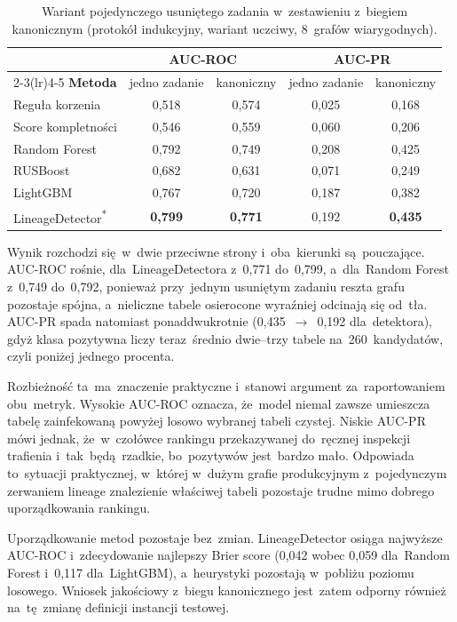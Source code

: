 \documentclass[polish,master,a4paper,oneside]{ppfcmthesis}
\renewcommand{\_}{\origtextunderscore\ifmmode\else\allowbreak\fi}
\begin{document}
\begin{table}[ht]
\centering
\caption[Wariant pojedynczego usuniętego zadania]{Wariant pojedynczego usuniętego zadania w~zestawieniu z~biegiem
kanonicznym (protokół indukcyjny, wariant uczciwy, 8~grafów wiarygodnych).}
\label{tab:jednojob}
\small
\begin{tabular}{lcccc}
\toprule
& \multicolumn{2}{c}{\textbf{AUC-ROC}} & \multicolumn{2}{c}{\textbf{AUC-PR}} \\
\cmidrule(lr){2-3}\cmidrule(lr){4-5}
\textbf{Metoda} & jedno zadanie & kanoniczny & jedno zadanie & kanoniczny \\
\midrule
Reguła korzenia       & 0{,}518 & 0{,}574 & 0{,}025 & 0{,}168 \\
Score kompletności    & 0{,}546 & 0{,}559 & 0{,}060 & 0{,}206 \\
\midrule
Random Forest         & 0{,}792 & 0{,}749 & 0{,}208 & 0{,}425 \\
RUSBoost              & 0{,}682 & 0{,}631 & 0{,}071 & 0{,}249 \\
LightGBM              & 0{,}767 & 0{,}720 & 0{,}187 & 0{,}382 \\
LineageDetector\textsuperscript{*} & \textbf{0{,}799} & \textbf{0{,}771} & 0{,}192 & \textbf{0{,}435} \\
\bottomrule
\end{tabular}
\end{table}

Wynik rozchodzi się~w~dwie przeciwne strony i~oba~kierunki są~pouczające.
AUC-ROC rośnie, dla~LineageDetectora z~0{,}771 do~0{,}799, a~dla~Random
Forest z~0{,}749 do~0{,}792, ponieważ przy~jednym usuniętym zadaniu reszta
grafu pozostaje spójna, a~nieliczne tabele osierocone wyraźniej odcinają się
od~tła. AUC-PR spada natomiast ponaddwukrotnie (0{,}435~$\to$~0{,}192
dla~detektora), gdyż klasa pozytywna liczy teraz~średnio dwie--trzy tabele
na~260~kandydatów, czyli poniżej jednego procenta.

Rozbieżność ta~ma~znaczenie praktyczne i~stanowi argument za~raportowaniem
obu~metryk. Wysokie AUC-ROC oznacza, że~model niemal zawsze umieszcza tabelę
zainfekowaną powyżej losowo wybranej tabeli czystej. Niskie AUC-PR mówi
jednak, że~w~czołówce rankingu przekazywanej do~ręcznej inspekcji trafienia
i~tak~będą~rzadkie, bo~pozytywów jest~bardzo mało. Odpowiada to~sytuacji
praktycznej, w~której w~dużym grafie produkcyjnym z~pojedynczym zerwaniem
lineage znalezienie właściwej tabeli pozostaje trudne mimo dobrego
uporządkowania rankingu.

Uporządkowanie metod pozostaje bez~zmian. LineageDetector osiąga najwyższe
AUC-ROC i~zdecydowanie najlepszy Brier score (0{,}042 wobec 0{,}059
dla~Random Forest i~0{,}117 dla~LightGBM), a~heurystyki pozostają w~pobliżu
poziomu losowego. Wniosek jakościowy z~biegu kanonicznego jest~zatem odporny
również na~tę~zmianę definicji instancji testowej.
\end{document}
